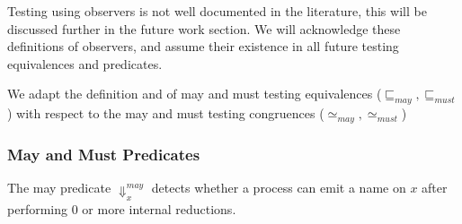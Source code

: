 Testing using observers is not well documented in the literature, this will be discussed further in the future work section. We will acknowledge these definitions of observers, and assume their existence in all future testing equivalences and predicates.

We adapt the definition \cite{DBLP:journals/jlp/FournetG05} and \cite{10.1007/978-3-540-49382-2_9} of may and must testing equivalences ($\sqsubseteq_{may}, \sqsubseteq_{must}$)  with respect to the may and must testing congruences ($\simeq_{may}, \simeq_{must}$)

\subsubsection{May and Must Predicates}The may predicate $\Downarrow^{may}_{x}$ detects whether a process can emit a name on $x$ after performing 0 or more internal reductions. 
\vspace{10pt}

